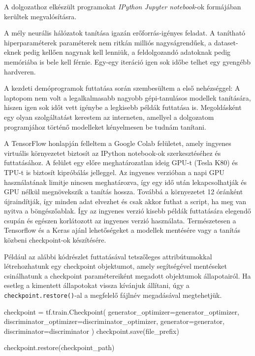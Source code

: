 A dolgozathoz elkészült programokat \textit{IPython Jupyter notebook}-ok \cite{jupyter} formájában kerültek megvalósításra.


A mély neurális hálózatok tanítása igazán erőforrás-igényes feladat. A tanítható hiperparaméterek paraméterek nem ritkán milliós nagyságrendűek, a dataset-eknek pedig kellően nagynak kell lenniük, a feldolgozandó adatoknak pedig memóriába is bele kell férnie. Egy-egy iteráció igen sok időbe telhet egy gyengébb hardveren.

A kezdeti demóprogramok futtatása során szembesültem a első nehézséggel: A laptopom nem volt a legalkalmasabb nagyobb gépi-tanulásos modellek tanítására, hiszen igen sok időt vett igénybe a legkisebb példák futtatása is. Megoldásként egy olyan szolgáltatást kerestem az interneten, amellyel a dolgozatom programjához történő modelleket kényelmesen be tudnám tanítani.

A TensorFlow honlapján felleltem a Google Colab \cite{colab} felületet, amely ingyenes virtuális környezetet biztosít az IPython notebook-ok szerkesztéséhez és futtatásához. A felület egy előre meghatározatlan ideig GPU-t (Tesla K80) és TPU-t is biztosít kipróbálás jelleggel. Az ingyenes verzióban a napi GPU használatának limitje nincsen meghatározva, így egy idő után lekapcsolhatják és GPU nélkül megnövekszik a tanítás hossza. Továbbá a környezetet 12 óránként újraindítják, így minden adat elvezhet és csak akkor futhat a script, ha meg van nyitva a böngészőablak. Így az ingyenes verzió kisebb példák futtatására elegendő csupán és egészen korlátozott az ingyenes verzió használata. Természetesen a Tensorflow és a Keras ajánl lehetőségeket a modellek mentésére vagy a tanítás közbeni checkpoint-ok készítésére.

Például az alábbi kódrészlet futtatásával tetszőleges attribútumokkal létrehozhatunk egy checkpoint objektumot, amely segítségével mentéseket csinálhatunk a checkpoint paramétereiként megadott objektumok állapotairól. Ha esetleg a kimentett állapotokat vissza kívánjuk állítani, úgy a \texttt{checkpoint.restore()}-al a megfelelő fájlnév megadásával megtehetjük.
\begin{python}
checkpoint = tf.train.Checkpoint(
    generator_optimizer=generator_optimizer,
    discriminator_optimizer=discriminator_optimizer,
    generator=generator,
    discriminator=discriminator
)
checkpoint.save(file_prefix)

checkpoint.restore(checkpoint_path)
\end{python}

